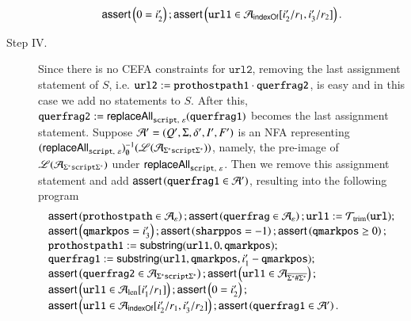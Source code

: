 \begin{example}
\begin{description}
\[\begin{array}{l}
		\textsf{assert}\left(0= i'_2\right); \textsf{assert}\left(\mathtt{url1} \in \mathcal{A}_{\mathsf{indexOf}}[i'_2/r_1, i'_3/r_2]\right).
		\end{array}
		\]
		\item[Step IV.] Since there is no CEFA constraints for $\mathtt{url2}$, removing the last assignment statement of $S$, i.e. $\mathtt{url2} := \mathtt{prothostpath1} \cdot \mathtt{querfrag2}$, is easy and in this case we add no statements to $S$. After this, $\mathtt{querfrag2} := \mathsf{replaceAll}_{\mathtt{script},\ \varepsilon}(\mathtt{querfrag1})$ becomes the last assignment statement. Suppose $\mathcal{A}'=(Q', \Sigma, \delta', I', F')$ is an NFA representing $(\mathsf{replaceAll}_{\mathtt{script},\ \varepsilon})^{-1}_\emptyset(\mathscr{L}(\mathcal{A}_{\Sigma^*\mathtt{script}\Sigma^*}))$, namely, the pre-image of $\mathscr{L}(\mathcal{A}_{\Sigma^*\mathtt{script}\Sigma^*})$ under $\mathsf{replaceAll}_{\mathtt{script},\ \varepsilon}$. Then we remove this assignment statement and add $\textsf{assert}\left(\mathtt{querfrag1 \in \mathcal{A}'}\right)$, resulting into the following program
		\[ 
		\begin{array}{l}
		\textsf{assert}\left(\mathtt{prothostpath} \in \mathcal{A}_\varepsilon\right); \textsf{assert}\left(\mathtt{querfrag} \in \mathcal{A}_\varepsilon\right); \mathtt{url1} := \mathcal{T}_{\rm trim}(\mathtt{url}); \\
		\textsf{assert}\left(\mathtt{qmarkpos} = i'_3\right); \textsf{assert}\left(\mathtt{sharppos} =-1 \right); \textsf{assert}\left(\mathtt{qmarkpos} \ge 0\right); \\ 
		\mathtt{prothostpath1} := \mathsf{substring}(\mathtt{url1}, 0, \mathtt{qmarkpos});\\
		\mathtt{querfrag1} := \mathsf{substring}(\mathtt{url1, qmarkpos}, i'_1 - \mathtt{qmarkpos});\\
		\textsf{assert}\left(\mathtt{querfrag2} \in  \mathcal{A}_{\Sigma^*\mathtt{script}\Sigma^*}\right);  
		\textsf{assert}\left(\mathtt{url1} \in  \mathcal{A}_{\overline{\Sigma^*\#\Sigma^*}}\right); \\
		\textsf{assert}\left(\mathtt{url1} \in \mathcal{A}_{\rm len}[i'_1/r_1]\right);  \textsf{assert}\left(0= i'_2\right); \\
		\textsf{assert}\left(\mathtt{url1} \in \mathcal{A}_{\mathsf{indexOf}}[i'_2/r_1, i'_3/r_2]\right);  \textsf{assert}\left(\mathtt{querfrag1} \in \mathcal{A}'\right).
		\end{array}
		\]
		

\end{description}
\end{example}
